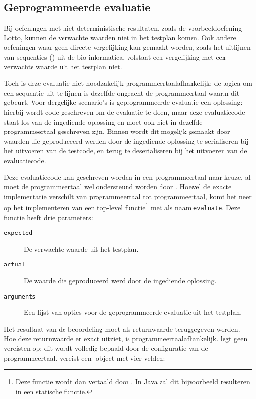 \subsection{Geprogrammeerde evaluatie}\label{subsec:geprogrammeerde-evaluatie}

Bij oefeningen met niet-deterministische resultaten, zoals de voorbeeldoefening Lotto, kunnen de verwachte waarden niet in het testplan komen.
Ook andere oefeningen waar geen directe vergelijking kan gemaakt worden, zoals het uitlijnen van sequenties () uit de bio-informatica, volstaat een vergelijking met een verwachte waarde uit het testplan niet.

Toch is deze evaluatie niet noodzakelijk programmeertaalafhankelijk: de logica om een sequentie uit te lijnen is dezelfde ongeacht de programmeertaal waarin dit gebeurt.
Voor dergelijke scenario's is geprogrammeerde evaluatie een oplossing: hierbij wordt code geschreven om de evaluatie te doen, maar deze evaluatiecode staat los van de ingediende oplossing en moet ook niet in dezelfde programmeertaal geschreven zijn.
Binnen \tested{} wordt dit mogelijk gemaakt door waarden die geproduceerd werden door de ingediende oplossing te serialiseren bij het uitvoeren van de testcode, en terug te deserialiseren bij het uitvoeren van de evaluatiecode.

Deze evaluatiecode kan geschreven worden in een programmeertaal naar keuze, al moet de programmeertaal wel ondersteund worden door \tested{}.
Hoewel de exacte implementatie verschilt van programmeertaal tot programmeertaal, komt het neer op het implementeren van een top-level functie\footnote{
    Deze functie wordt dan vertaald door \tested{}.
    In Java zal dit bijvoorbeeld resulteren in een statische functie.
} met als naam \texttt{evaluate}.
Deze functie heeft drie parameters:

\begin{description}
    \item[\texttt{expected}] De verwachte waarde uit het testplan.
    \item[\texttt{actual}] De waarde die geproduceerd werd door de ingediende oplossing.
    \item[\texttt{arguments}] Een lijst van opties voor de geprogrammeerde evaluatie uit het testplan.
\end{description}

Het resultaat van de beoordeling moet als returnwaarde teruggegeven worden.
Hoe deze returnwaarde er exact uitziet, is programmeertaalafhankelijk.
\tested{} legt geen vereisten op: dit wordt volledig bepaald door de configuratie van de programmeertaal.
\tested{} vereist een -object met vier velden:

